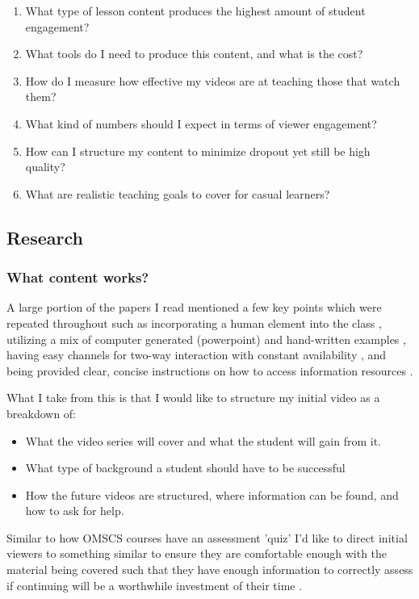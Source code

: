 \documentclass[
	letterpaper, %
]{jdf}
\begin{document}
\begin{enumerate}
    \item What type of lesson content produces the highest amount of student engagement?
    \item What tools do I need to produce this content, and what is the cost?
    \item How do I measure how effective my videos are at teaching those that watch them?
    \item What kind of numbers should I expect in terms of viewer engagement?
    \item How can I structure my content to minimize dropout yet still be high quality?
    \item What are realistic teaching goals to cover for casual learners?
\end{enumerate}

\subsection{Research}

\subsubsection{What content works?}

A large portion of the papers I read mentioned a few key points which were repeated throughout such as incorporating a human element into the class \citep{guo11} \citep{young6}, utilizing a mix of computer generated (powerpoint) and hand-written examples \citep{moore1}, having easy channels for two-way interaction with constant availability \citep{grandzol3}, and being provided clear, concise instructions on how to access information resources \citep{ralston4}.

What I take from this is that I would like to structure my initial video as a breakdown of:

\begin{itemize}
    \item What the video series will cover and what the student will gain from it.
    \item What type of background a student should have to be successful
    \item How the future videos are structured, where information can be found, and how to ask for help.
\end{itemize}

Similar to how OMSCS courses have an assessment 'quiz' I'd like to direct initial viewers to something similar to ensure they are comfortable enough with the material being covered such that they have enough information to correctly assess if continuing will be a worthwhile investment of their time \citep{picciano2002beyond15}. 
\end{document}
